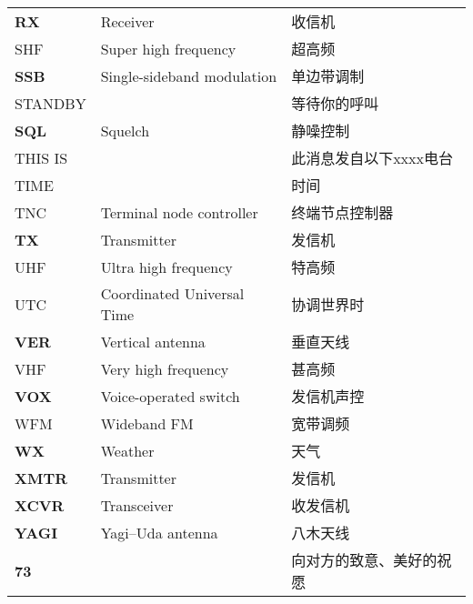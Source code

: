 \begin{longtable}[l]{lll}
  \textbf{RX}    & Receiver                             & 收信机                 \\
  SHF            & Super high frequency                 & 超高频                 \\
  \textbf{SSB}   & Single-sideband modulation           & 单边带调制               \\
  STANDBY        &                                      & 等待你的呼叫              \\
  \textbf{SQL}   & Squelch                              & 静噪控制                \\
  THIS IS        &                                      & 此消息发自以下xxxx电台       \\
  TIME           &                                      & 时间                  \\
  TNC            & Terminal node controller             & 终端节点控制器             \\
  \textbf{TX}    & Transmitter                          & 发信机                 \\
  UHF            & Ultra high frequency                 & 特高频                 \\
  UTC            & Coordinated Universal Time           & 协调世界时               \\
  \textbf{VER}   & Vertical antenna                     & 垂直天线                \\
  VHF            & Very high frequency                  & 甚高频                 \\
  \textbf{VOX}   & Voice-operated switch                & 发信机声控               \\
  WFM            & Wideband FM                          & 宽带调频                \\
  \textbf{WX}    & Weather                              & 天气                  \\
  \textbf{XMTR}  & Transmitter                          & 发信机                 \\
  \textbf{XCVR}  & Transceiver                          & 收发信机                \\
  \textbf{YAGI}  & Yagi–Uda antenna                     & 八木天线                \\
  \textbf{73}    &                                      & 向对方的致意、美好的祝愿        \\
\end{longtable}

